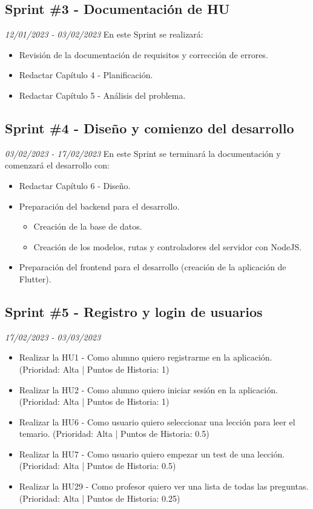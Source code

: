 \subsection{Sprint \#3 - Documentación de HU}
\textit{12/01/2023   -   03/02/2023}
En este Sprint se realizará:
\begin{itemize}
    \item Revisión de la documentación de requisitos y corrección de errores.
    \item Redactar Capítulo 4 - Planificación.
    \item Redactar Capítulo 5 - Análisis del problema.
\end{itemize}
\subsection{Sprint \#4 - Diseño y comienzo del desarrollo}
\textit{03/02/2023   -   17/02/2023}
En este Sprint se terminará la documentación y comenzará el desarrollo con:
\begin{itemize}
    \item Redactar Capítulo 6 - Diseño.
    \item Preparación del backend para el desarrollo.
    \begin{itemize}
        \item Creación de la base de datos.
        \item Creación de los modelos, rutas y controladores del servidor con NodeJS.
    \end{itemize}
    \item Preparación del frontend para el desarrollo (creación de la aplicación de Flutter).
\end{itemize}
\subsection{Sprint \#5 - Registro y login de usuarios}
\textit{17/02/2023   -   03/03/2023}
\begin{itemize}
    \item Realizar la HU1 - Como alumno quiero registrarme en la aplicación. (Prioridad: Alta | Puntos de Historia: 1)
    \item Realizar la HU2 - Como alumno quiero iniciar sesión en la aplicación. (Prioridad: Alta | Puntos de Historia: 1)
    \item Realizar la HU6 - Como usuario quiero seleccionar una lección para leer el temario. (Prioridad: Alta | Puntos de Historia: 0.5)
    \item Realizar la HU7 - Como usuario quiero empezar un test de una lección. (Prioridad: Alta | Puntos de Historia: 0.5)
    \item Realizar la HU29 - Como profesor quiero ver una lista de todas las preguntas. (Prioridad: Alta | Puntos de Historia: 0.25)

\end{itemize}


